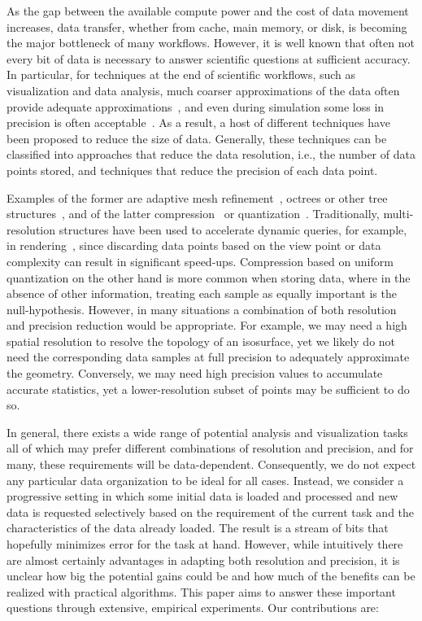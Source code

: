 As the gap between the available compute power and the cost of data movement increases, data
transfer, whether from cache, main memory, or disk, is becoming the major bottleneck of many
workflows. However, it is well known that often not every bit of data is necessary to answer
scientific questions at sufficient accuracy. In particular, for techniques at the end of scientific
workflows, such as visualization and data analysis, much coarser approximations of the data often
provide adequate approximations~\cite{woodring2011,covra2012,compression_sim2013}, and even during
simulation some loss in precision is often acceptable~\cite{compression_sim2013}. As a result, a
host of different techniques have been proposed to reduce the size of data. Generally, these
techniques can be classified into approaches that reduce the data resolution, i.e., the number of
data points stored, and techniques that reduce the precision of each data point.

Examples of the former are adaptive mesh refinement~\cite{amr1989}, octrees or other tree
structures~\cite{hierarchical1984}, and of the latter compression~\cite{zfp2014} or
quantization~\cite{vq1992}. Traditionally, multi-resolution structures have been used to accelerate
dynamic queries, for example, in rendering~\cite{multires_octree1999}, since discarding data points
based on the view point or data complexity can result in significant speed-ups. Compression based on
uniform quantization on the other hand is more common when storing data, where in the absence of
other information, treating each sample as equally important is the null-hypothesis. However, in
many situations a combination of both resolution and precision reduction would be appropriate. For
example, we may need a high spatial resolution to resolve the topology of an isosurface, yet we
likely do not need the corresponding data samples at full precision to adequately approximate the
geometry. Conversely, we may need high precision values to accumulate accurate statistics, yet a
lower-resolution subset of points may be sufficient to do so. 

In general, there exists a wide range of potential analysis and visualization tasks all of which may
prefer different combinations of resolution and precision, and for many, these requirements will be
data-dependent. Consequently, we do not expect any particular data organization to be ideal for all
cases. Instead, we consider a progressive setting in which some initial data is loaded and processed
and new data is requested selectively based on the requirement of the current task and the
characteristics of the data already loaded. The result is a stream of bits that hopefully minimizes
error for the task at hand. However, while intuitively there are almost certainly advantages in
adapting both resolution and precision, it is unclear how big the potential gains could be and how
much of the benefits can be realized with practical algorithms. This paper aims to answer these
important questions through extensive, empirical experiments. Our contributions are:

